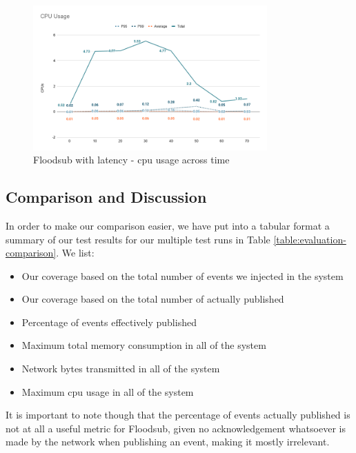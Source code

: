\begin{figure}[!htb]
  \centering
  \includegraphics[width=0.8\textwidth]{img/graph-floodsub-cpu.png}
  \caption{Floodsub with latency - \acrshort{cpu} usage across time}
  \label{fig:graph-floodsub-latency-cpu}
\end{figure}

\subsection{Comparison and Discussion}\label{subsec:comparison}

In order to make our comparison easier, we have put into a tabular format a
summary of our test results for our multiple test runs in Table
\ref{table:evaluation-comparison}. We list:

\begin{itemize}
  \item Our coverage based on the total number of events we injected in the
    system
  \item Our coverage based on the total number of actually published
  \item Percentage of events effectively published
  \item Maximum total memory consumption in all of the system
  \item Network bytes transmitted in all of the system
  \item Maximum \acrshort{cpu} usage in all of the system
\end{itemize}

It is important to note though that the percentage of events actually published
is not at all a useful metric for Floodsub, given no acknowledgement whatsoever
is made by the network when publishing an event, making it mostly irrelevant.

